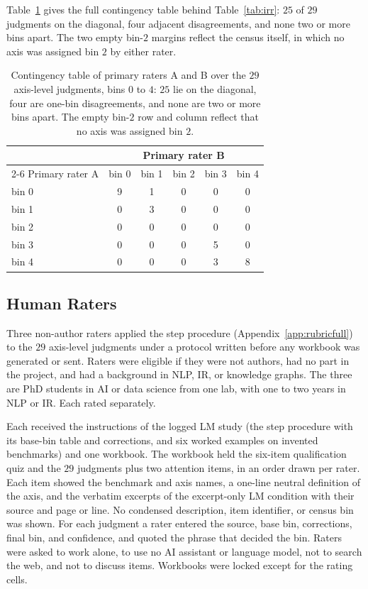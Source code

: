 \documentclass[11pt]{article}
\begin{document}
Table~\ref{tab:confusion} gives the full contingency table behind Table~\ref{tab:irr}: $25$ of $29$ judgments on the diagonal, four adjacent disagreements, and none two or more bins apart. The two empty bin-$2$ margins reflect the census itself, in which no axis was assigned bin $2$ by either rater.

\begin{table}[ht]\centering\small
\begin{tabular}{lccccc}
\toprule
 & \multicolumn{5}{c}{Primary rater B}\\
\cmidrule(lr){2-6}
Primary rater A & bin 0 & bin 1 & bin 2 & bin 3 & bin 4\\
\midrule
bin 0 & 9 & 1 & 0 & 0 & 0\\
bin 1 & 0 & 3 & 0 & 0 & 0\\
bin 2 & 0 & 0 & 0 & 0 & 0\\
bin 3 & 0 & 0 & 0 & 5 & 0\\
bin 4 & 0 & 0 & 0 & 3 & 8\\
\bottomrule
\end{tabular}
\caption{Contingency table of primary raters A and B over the $29$ axis-level judgments, bins $0$ to $4$: $25$ lie on the diagonal, four are one-bin disagreements, and none are two or more bins apart. The empty bin-$2$ row and column reflect that no axis was assigned bin $2$.}
\label{tab:confusion}
\end{table}

\subsection{Human Raters}
\label{app:humanraters}
Three non-author raters applied the step procedure (Appendix~\ref{app:rubricfull}) to the $29$ axis-level judgments under a protocol written before any workbook was generated or sent. Raters were eligible if they were not authors, had no part in the project, and had a background in NLP, IR, or knowledge graphs. The three are PhD students in AI or data science from one lab, with one to two years in NLP or IR. Each rated separately.

Each received the instructions of the logged LM study (the step procedure with its base-bin table and corrections, and six worked examples on invented benchmarks) and one workbook. The workbook held the six-item qualification quiz and the $29$ judgments plus two attention items, in an order drawn per rater. Each item showed the benchmark and axis names, a one-line neutral definition of the axis, and the verbatim excerpts of the excerpt-only LM condition with their source and page or line. No condensed description, item identifier, or census bin was shown. For each judgment a rater entered the source, base bin, corrections, final bin, and confidence, and quoted the phrase that decided the bin. Raters were asked to work alone, to use no AI assistant or language model, not to search the web, and not to discuss items. Workbooks were locked except for the rating cells.
\end{document}
